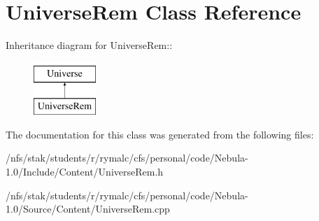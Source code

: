 \hypertarget{classUniverseRem}{
\section{UniverseRem Class Reference}
\label{classUniverseRem}
}
Inheritance diagram for UniverseRem::\begin{figure}[H]
\begin{center}
\leavevmode
\includegraphics[height=2cm]{classUniverseRem}
\end{center}
\end{figure}


The documentation for this class was generated from the following files:\begin{DoxyCompactItemize}
\item 
/nfs/stak/students/r/rymalc/cfs/personal/code/Nebula-\/1.0/Include/Content/UniverseRem.h\item 
/nfs/stak/students/r/rymalc/cfs/personal/code/Nebula-\/1.0/Source/Content/UniverseRem.cpp\end{DoxyCompactItemize}

